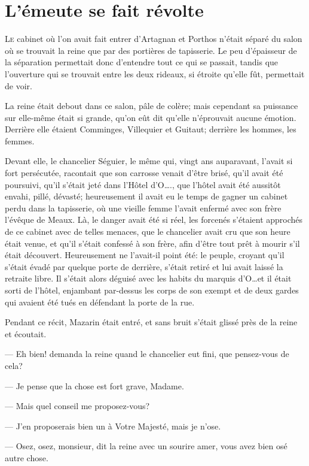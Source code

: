 \chapter{L'émeute se fait révolte}

\lettrine{L}{e} cabinet où l'on avait fait entrer d'Artagnan et Porthos n'était séparé du salon où se trouvait la reine que par des portières de tapisserie. Le peu d'épaisseur de la séparation permettait donc d'entendre tout ce qui se passait, tandis que l'ouverture qui se trouvait entre les deux rideaux, si étroite qu'elle fût, permettait de voir.

La reine était debout dans ce salon, pâle de colère; mais cependant sa puissance sur elle-même était si grande, qu'on eût dit qu'elle n'éprouvait aucune émotion. Derrière elle étaient Comminges, Villequier et Guitaut; derrière les hommes, les femmes.

Devant elle, le chancelier Séguier, le même qui, vingt ans auparavant, l'avait si fort persécutée, racontait que son carrosse venait d'être brisé, qu'il avait été poursuivi, qu'il s'était jeté dans l'Hôtel d'O\dots., que l'hôtel avait été aussitôt envahi, pillé, dévasté; heureusement il avait eu le temps de gagner un cabinet perdu dans la tapisserie, où une vieille femme l'avait enfermé avec son frère l'évêque de Meaux. Là, le danger avait été si réel, les forcenés s'étaient approchés de ce cabinet avec de telles menaces, que le chancelier avait cru que son heure était venue, et qu'il s'était confessé à son frère, afin d'être tout prêt à mourir s'il était découvert. Heureusement ne l'avait-il point été: le peuple, croyant qu'il s'était évadé par quelque porte de derrière, s'était retiré et lui avait laissé la retraite libre. Il s'était alors déguisé avec les habits du marquis d'O\dots et il était sorti de l'hôtel, enjambant par-dessus les corps de son exempt et de deux gardes qui avaient été tués en défendant la porte de la rue.

Pendant ce récit, Mazarin était entré, et sans bruit s'était glissé près de la reine et écoutait.

— Eh bien! demanda la reine quand le chancelier eut fini, que pensez-vous de cela?

— Je pense que la chose est fort grave, Madame.

— Mais quel conseil me proposez-vous?

— J'en proposerais bien un à Votre Majesté, mais je n'ose.

— Osez, osez, monsieur, dit la reine avec un sourire amer, vous avez bien osé autre chose.

